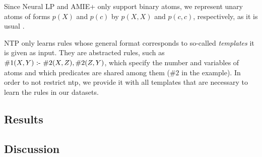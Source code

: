 
Since Neural LP and AMIE+ only support binary atoms, we represent unary atoms of forms $p(X)$ and $p(c)$ by $p(X,X)$ and $p(c,c)$, respectively, as it is usual \cite{EGre-jair18:learning-explanatory-rules}.

NTP only learns rules whose general format corresponds to so-called \emph{templates} it is given as input. They are abstracted rules, such as $\#1(X, Y) \text{ :- } \#2(X, Z), \#2(Z, Y) $, which specify the number and variables of atoms and which predicates are shared among them ($\#2$ in the example). In order to not restrict ntp, we provide it with all templates that are necessary to learn the rules in our datasets.

\subsection{Results}



\subsection{Discussion}


